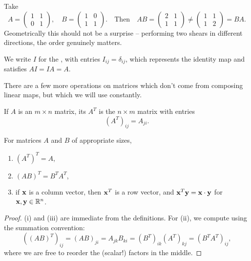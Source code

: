 \documentclass[a4paper]{scrartcl}
\begin{document}
\begin{example}
	Take
	$$
	A = \begin{pmatrix} 1 & 1 \\ 0 & 1\end{pmatrix}, \quad B = \begin{pmatrix} 1 & 0 \\ 1 & 1 \end{pmatrix}.
	\quad \text{Then} \quad
	AB = \begin{pmatrix} 2 & 1 \\ 1 & 1 \end{pmatrix} \neq \begin{pmatrix} 1 & 1 \\ 1 & 2\end{pmatrix} = BA.
	$$
	Geometrically this should not be a surprise -- performing two shears in different directions, the order genuinely matters.
\end{example}

We write $I$ for the , with entries $I_{ij} = \delta_{ij}$, which represents the identity map and satisfies $AI = IA = A$.

There are a few more operations on matrices which don't come from composing linear maps, but which we will use constantly.

\begin{definition}[Transpose]
	If $A$ is an $m \times n$ matrix, its  $A^T$ is the $n \times m$ matrix with entries
	$$
	(A^T)_{ij} = A_{ji}.
	$$
\end{definition}

\begin{proposition}
	For matrices $A$ and $B$ of appropriate sizes,
	\begin{enumerate}[label=(\roman*)]
		\item $(A^T)^T = A$,
		\item $(AB)^T = B^T A^T$,
		\item if $\mathbf{x}$ is a column vector, then $\mathbf{x}^T$ is a row vector, and $\mathbf{x}^T \mathbf{y} = \mathbf{x} \cdot \mathbf{y}$ for $\mathbf{x}, \mathbf{y} \in \mathbb{R}^n$.
	\end{enumerate}
\end{proposition}
\begin{proof}
	(i) and (iii) are immediate from the definitions. For (ii), we compute using the summation convention:
	$$
	((AB)^T)_{ij} = (AB)_{ji} = A_{jk}B_{ki} = (B^T)_{ik}(A^T)_{kj} = (B^T A^T)_{ij},
	$$
	where we are free to reorder the (scalar!) factors in the middle.
\end{proof}
\end{document}
